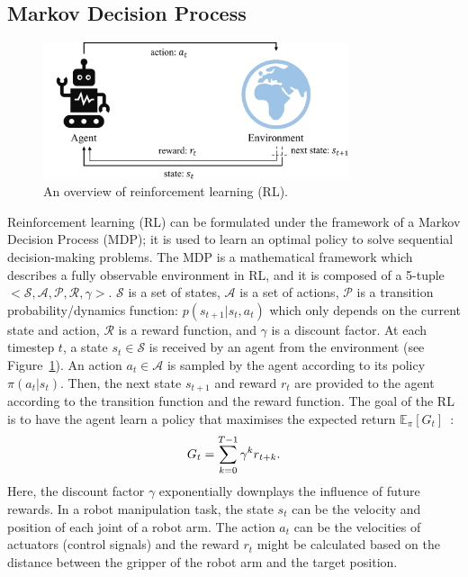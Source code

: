 \subsection{Markov Decision Process}
\begin{figure}[h]
    \centering
    \includegraphics[width=0.8\textwidth]{figures/background/mdp_background.pdf}
    \caption{An overview of reinforcement learning (RL).}
    \label{fig:rl_desc}
\end{figure}
Reinforcement learning (RL) can be formulated under the framework of a Markov Decision Process (MDP); it is used to learn an optimal policy to solve sequential decision-making problems. The MDP is a mathematical framework which describes a fully observable environment in RL, and it is composed of a 5-tuple $<\mathcal{S}, \mathcal{A}, \mathcal{P}, \mathcal{R}, \gamma>$. $\mathcal{S}$ is a set of states, $\mathcal{A}$ is a set of actions, $\mathcal{P}$ is a transition probability/dynamics function: $p(s_{t+1}|s_{t},a_{t})$ which only depends on the current state and action, $\mathcal{R}$ is a reward function, and $\gamma$ is a discount factor. At each timestep $t$, a state $s_{t}\in\mathcal{S}$ is received by an agent from the environment (see Figure~\ref{fig:rl_desc}). An action $a_{t}\in\mathcal{A}$ is sampled by the agent according to its policy $\pi(a_{t}|s_{t})$. Then, the next state $s_{t+1}$ and reward $r_{t}$ are provided to the agent according to the transition function and the reward function. The goal of the RL is to have the agent learn a policy that maximises the expected return $\mathbb{E}_{\pi}[G_{t}]$~\cite{sutton2018reinforcement}:
\begin{equation}
\centering
    G_{t} =\sum_{k=0}^{T-1}\gamma^{k}r_{t+k}.
\label{eq:acc_reward_func}
\end{equation}
Here, the discount factor $\gamma$ exponentially downplays the influence of future rewards. {In a robot manipulation task, the state $s_{t}$ can be the velocity and position of each joint of a robot arm. The action $a_{t}$ can be the velocities of actuators (control signals)} and the reward $r_{t}$ might be calculated based on the distance between the gripper of the robot arm and the target position.

